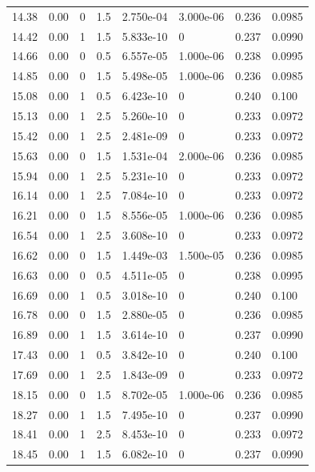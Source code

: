 \documentclass[preview]{standalone}
\begin{document}
{{{\begin{tabular}{L{1.2cm}C{1.2cm} C{0.3cm}C{0.5cm} C{1.4cm}C{1.4cm} C{1.4cm}C{1.4cm}}
  14.38  &  0.00  & 0     & 1.5 &  2.750e-04  & 3.000e-06  & 0.236 &  0.0985   \\ 
  14.42  &  0.00  & 1     & 1.5 &  5.833e-10  & 0  & 0.237 &  0.0990   \\ 
  14.66  &  0.00  & 0     & 0.5 &  6.557e-05  & 1.000e-06  & 0.238 &  0.0995   \\ 
  14.85  &  0.00  & 0     & 1.5 &  5.498e-05  & 1.000e-06  & 0.236 &  0.0985   \\ 
  15.08  &  0.00  & 1     & 0.5 &  6.423e-10  & 0  & 0.240 &  0.100   \\ 
  15.13  &  0.00  & 1     & 2.5 &  5.260e-10  & 0  & 0.233 &  0.0972   \\ 
  15.42  &  0.00  & 1     & 2.5 &  2.481e-09  & 0  & 0.233 &  0.0972   \\ 
  15.63  &  0.00  & 0     & 1.5 &  1.531e-04  & 2.000e-06  & 0.236 &  0.0985   \\ 
  15.94  &  0.00  & 1     & 2.5 &  5.231e-10  & 0  & 0.233 &  0.0972   \\ 
  16.14  &  0.00  & 1     & 2.5 &  7.084e-10  & 0  & 0.233 &  0.0972   \\ 
  16.21  &  0.00  & 0     & 1.5 &  8.556e-05  & 1.000e-06  & 0.236 &  0.0985   \\ 
  16.54  &  0.00  & 1     & 2.5 &  3.608e-10  & 0  & 0.233 &  0.0972   \\ 
  16.62  &  0.00  & 0     & 1.5 &  1.449e-03  & 1.500e-05  & 0.236 &  0.0985   \\ 
  16.63  &  0.00  & 0     & 0.5 &  4.511e-05  & 0  & 0.238 &  0.0995   \\ 
  16.69  &  0.00  & 1     & 0.5 &  3.018e-10  & 0  & 0.240 &  0.100   \\ 
  16.78  &  0.00  & 0     & 1.5 &  2.880e-05  & 0  & 0.236 &  0.0985   \\ 
  16.89  &  0.00  & 1     & 1.5 &  3.614e-10  & 0  & 0.237 &  0.0990   \\ 
  17.43  &  0.00  & 1     & 0.5 &  3.842e-10  & 0  & 0.240 &  0.100   \\ 
  17.69  &  0.00  & 1     & 2.5 &  1.843e-09  & 0  & 0.233 &  0.0972   \\ 
  18.15  &  0.00  & 0     & 1.5 &  8.702e-05  & 1.000e-06  & 0.236 &  0.0985   \\ 
  18.27  &  0.00  & 1     & 1.5 &  7.495e-10  & 0  & 0.237 &  0.0990   \\ 
  18.41  &  0.00  & 1     & 2.5 &  8.453e-10  & 0  & 0.233 &  0.0972   \\ 
  18.45  &  0.00  & 1     & 1.5 &  6.082e-10  & 0  & 0.237 &  0.0990   \\ 

\end{tabular}}}}
\end{document}
